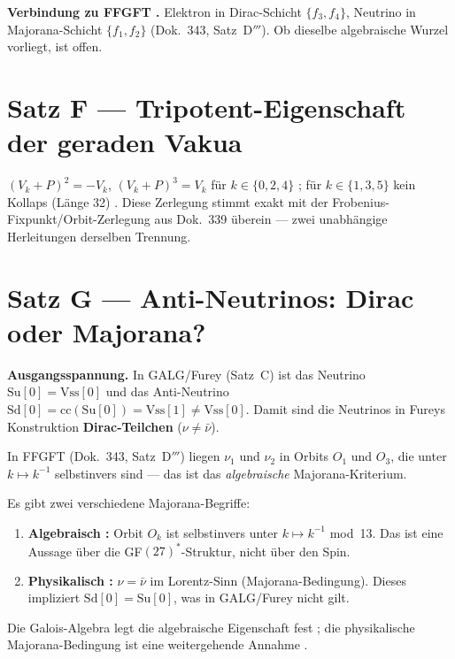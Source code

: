 \textbf{Verbindung zu FFGFT \SM.} Elektron in Dirac-Schicht $\{f_3,f_4\}$,
Neutrino in Majorana-Schicht $\{f_1,f_2\}$ (Dok.~343, Satz~D$'''$). Ob dieselbe
algebraische Wurzel vorliegt, ist offen.

\section{Satz F --- Tripotent-Eigenschaft der geraden Vakua}

$(V_k + P)^2 = -V_k$, $(V_k+P)^3 = V_k$ f\"ur $k \in \{0,2,4\}$ \BM;
f\"ur $k \in \{1,3,5\}$ kein Kollaps (L\"ange 32) \BM.
Diese Zerlegung stimmt exakt mit der Frobenius-Fixpunkt/Orbit-Zerlegung aus Dok.~339 \"uberein ---
zwei unabh\"angige Herleitungen derselben Trennung.



\section{Satz G --- Anti-Neutrinos: Dirac oder Majorana?}

\textbf{Ausgangsspannung.} In GALG/Furey (Satz~C) ist das Neutrino
$\mathrm{Su}[0] = \mathrm{Vss}[0]$ und das Anti-Neutrino $\mathrm{Sd}[0] = \mathrm{cc}(\mathrm{Su}[0]) = \mathrm{Vss}[1] \neq \mathrm{Vss}[0]$.
Damit sind die Neutrinos in Fureys Konstruktion \textbf{Dirac-Teilchen} ($\nu \neq \bar\nu$).

In FFGFT (Dok.~343, Satz~D$'''$) liegen $\nu_1$ und $\nu_2$ in Orbits $O_1$ und $O_3$,
die unter $k\mapsto k^{-1}$ selbstinvers sind --- das ist das \emph{algebraische} Majorana-Kriterium.

\begin{theorem}
Es gibt zwei verschiedene Majorana-Begriffe:
\begin{enumerate}
\item \textbf{Algebraisch \BM:} Orbit $O_k$ ist selbstinvers unter $k\mapsto k^{-1}$ mod~13.
      Das ist eine Aussage über die GF$(27)^*$-Struktur, nicht über den Spin.
\item \textbf{Physikalisch \SM:} $\nu = \bar\nu$ im Lorentz-Sinn (Majorana-Bedingung).
      Dieses impliziert $\mathrm{Sd}[0] = \mathrm{Su}[0]$, was in GALG/Furey
      nicht gilt.
\end{enumerate}
Die Galois-Algebra legt die algebraische Eigenschaft fest \BM; die physikalische
Majorana-Bedingung ist eine weitergehende Annahme \SM.
\end{theorem}

